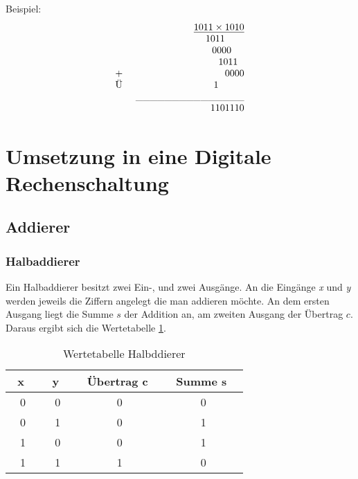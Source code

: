 \documentclass[a4paper,12pt,fleqn,oneside]{article}
\begin{document}
		Beispiel:
			\[ \begin{array}{lrcll}
   					&		 	       	\uline{1 0 1 1 \times 1 0 1 0}   	 				\\
  			       		&   			            1 0 1 1 $ $$ $$ $$ $$ $$ $        	 			\\ 
					&   			            0 0 0 0 $ $$ $$ $$ $        	 				\\ 
					&   			            1 0 1 1 $ $$ $        	 					\\ 
				$+ $	&   			            0 0 0 0			        	 				\\ 
				$Ü $	&			      	    1 $ $$ $$ $$ $$ $$ $$ $$ $					\\
					&	\_\_\_\_\_\_\_\_\_\_\_\_\_\_\_						\\
					&				    1101110
			\end{array} \]

			

\newpage
	
	\section{Umsetzung in eine Digitale Rechenschaltung}
	\subsection{Addierer}
	\subsubsection{Halbaddierer}
	Ein Halbaddierer besitzt zwei Ein-, und zwei Ausgänge. An die Eingänge \emph{x} und \emph{y} werden jeweils die Ziffern 			angelegt die man addieren möchte. An dem ersten Ausgang liegt die Summe $s$ der Addition an, am zweiten Ausgang der 			Übertrag $c$.\\
	Daraus ergibt sich die Wertetabelle \ref{tab:halbaddierer}.
	\begin{table}[h]
		\center
		\begin{tabular}{c|c|c|c}
			\ \textbf{x} \ 	& \ \textbf{y} \ 	& \ \textbf{Übertrag c} \ & \ \textbf{Summe s} \ 	 	\\ \hline
			0 	& 0 		& 0          		& 0       			\\ \hline
			0 	& 1 		& 0          		& 1       			\\ \hline	
			1 	& 0		& 0          		& 1      			 \\ \hline
			1	& 1 		& 1          		& 0      			 \\
		\end{tabular}
		\caption{Wertetabelle Halbddierer}
		\label{tab:halbaddierer}
	\end{table}
\end{document}

